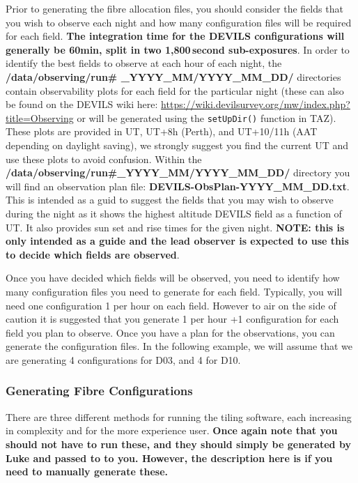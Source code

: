 \documentclass[12pt]{article}
\begin{document}
Prior to generating the fibre allocation files, you should consider the fields that you wish to observe each night and how many configuration files will be required for each field. \textbf{The integration time for the DEVILS configurations will generally be 60min, split in two 1,800\,second sub-exposures}. In order to identify the best fields to observe at each hour of each night, the \textbf{/data/observing/run\# \_YYYY\_MM/YYYY\_MM\_DD/} directories contain observability plots for each field for the particular night (these can also be found on the DEVILS wiki here: \url{https://wiki.devilsurvey.org/mw/index.php?title=Observing} or will be generated using the \texttt{setUpDir()} function in TAZ). These plots are provided in UT, UT+8h (Perth), and UT+10/11h (AAT depending on daylight saving), we strongly suggest you find the current UT and use these plots to avoid confusion. Within the \textbf{/data/observing/run\#\_YYYY\_MM/YYYY\_MM\_DD/}  directory you will find an observation plan file: \textbf{DEVILS-ObsPlan-YYYY\_MM\_DD.txt}. This is intended as a guid to suggest the fields that you may wish to observe during the night as it shows the highest altitude DEVILS field as a function of UT. It also provides sun set and rise times for the given night. \textbf{\textcolor{PineGreen}{NOTE:
 this is only intended as a guide and the lead observer is expected to use this to decide which fields are observed}}.

Once you have decided which fields will be observed, you need to identify how many configuration files you need to generate for each field. Typically, you will need one configuration 1 per hour on each field. However to air on the side of caution it is suggested that you generate 1 per hour +1 configuration for each field you plan to observe. Once you have a plan for the observations, you can generate the configuration files. In the following example, we will assume that we are generating 4 configurations for D03, and 4 for D10.      


\subsubsection{Generating Fibre Configurations}

There are three different methods for running the tiling software, each increasing in complexity and for the more experience user. \textbf{\textcolor{PineGreen}{Once again note that you should not have to run these, and they should simply be generated by Luke and passed to to you. However, the description here is if you need to manually generate these.}}
\end{document}
